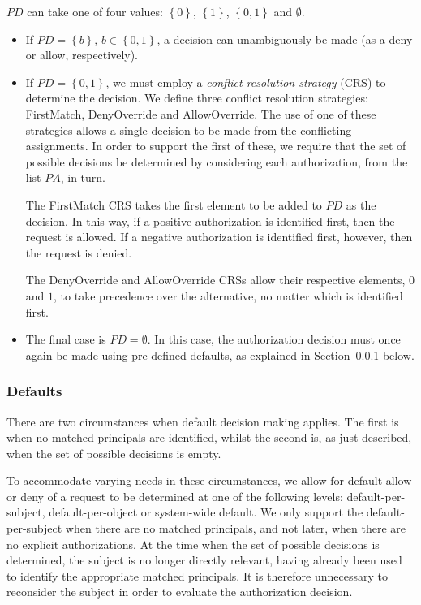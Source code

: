 \documentclass{article}
\newcommand{\set}[1]{\ensuremath{\left\{#1\right\}}} \newcommand{\sett}[1]{\ensuremath{\left\{\textit{#1}\right\}}} \newcommand{\tuple}[1]{\ensuremath{\left(#1\right)}} \newcommand{\tuplet}[1]{\ensuremath{\left(\textit{#1}\right)}}
\newcommand{\pa}{\mathit{PA}}
\newcommand{\pd}{\mathit{PD}}
\begin{document}
$\pd$ can take one of four values: $\set{0}$, $\set{1}$, $\set{0,1}$ and $\emptyset$.
\begin{itemize}
  \item If $\pd = \set{b}$, $b \in \set{0,1}$, a decision can unambiguously be made (as a deny or allow, respectively).
\item If $\pd = \set{0,1}$, we must employ a \emph{conflict resolution strategy} (CRS) to determine the decision.
	We define three conflict resolution strategies: \textsf{FirstMatch}, \textsf{DenyOverride} and \textsf{AllowOverride}.
    The use of one of these strategies allows a single decision to be made from the conflicting assignments.
	In order to support the first of these, we require that the set of possible decisions be determined by considering each authorization, from the list $\pa$, in turn.
	
	The \textsf{FirstMatch} CRS takes the first element to be added to $\pd$ as the decision.
	In this way, if a positive authorization is identified first, then the request is allowed.
	If a negative authorization is identified first, however, then the request is denied.
	
	The \textsf{DenyOverride} and \textsf{AllowOverride} CRSs allow their respective elements, $0$ and $1$, to take precedence over the alternative, no matter which is identified first.
  \item The final case is $\pd = \emptyset$. In this case, the authorization decision must once again be made using pre-defined defaults, as explained in Section~\ref{sec:AuthZModel:ReqEval:Defaults} below.
\end{itemize}


\subsubsection{Defaults}\label{sec:AuthZModel:ReqEval:Defaults}
There are two circumstances when default decision making applies. The first is when no matched principals are identified, whilst the second is, as just described, when the set of possible decisions is empty.

To accommodate varying needs in these circumstances, we allow for default allow or deny of a request to be determined at one of the following levels: default-per-subject, default-per-object or system-wide default. We only support the default-per-subject when there are no matched principals, and not later, when there are no explicit authorizations. At the time when the set of possible decisions is determined, the subject is no longer directly relevant, having already been used to identify the appropriate matched principals. It is therefore unnecessary to reconsider the subject in order to evaluate the authorization decision.
\end{document}
